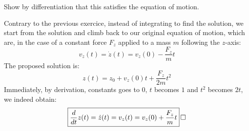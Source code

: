 \documentclass[solutions.tex]{subfiles}
\begin{document}
\maketitle
\begin{exercise}
Show by differentiation that this satisfies the equation of motion.
\end{exercise}
Contrary to the previous exercice, instead of integrating to find
the solution, we start from the solution and climb back to our original
equation of motion, which are, in the case of a constant force $F_z$
applied to a mass $m$ following the $z$-axis:
\[
	v_z(t) = \dot{z}(t) = v_z(0) - \frac{F_z}{m}t
\]
The proposed solution is:
\[
	z(t) = z_0 + v_z(0)t + \frac{F_z}{2m}t^2
\]
Immediately, by derivation, constants goes to $0$, $t$ becomes $1$ and
$t^2$ becomes $2t$, we indeed obtain:
\[
	\boxed{\frac{d}{dt}z(t) = \dot{z}(t) = v_z(t) = v_z(0) + \frac{F_z}{m}t}\qed
\]
\end{document}
